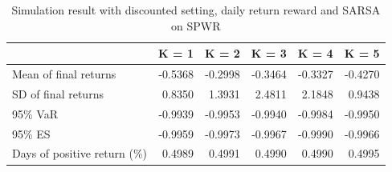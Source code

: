 \documentclass{article}
\begin{document}
\begin{table}[H]
\centering
\begin{tabular}{|l|r|r|r|r|r|} 
\hline
                             & \multicolumn{1}{l|}{K = 1} & \multicolumn{1}{l|}{K = 2} & \multicolumn{1}{l|}{K = 3} & \multicolumn{1}{l|}{K = 4} & \multicolumn{1}{l|}{K = 5}  \\ 
\hline
Mean of final returns        & -0.5368                    & -0.2998                    & -0.3464                    & -0.3327                    & -0.4270                     \\ 
\hline
SD of final returns          & 0.8350                     & 1.3931                     & 2.4811                     & 2.1848                     & 0.9438                      \\ 
\hline
95\% VaR                     & -0.9939                    & -0.9953                    & -0.9940                    & -0.9984                    & -0.9950                     \\ 
\hline
95\% ES                      & -0.9959                    & -0.9973                    & -0.9967                    & -0.9990                    & -0.9966                     \\ 
\hline
Days of positive return (\%) & 0.4989                     & 0.4991                     & 0.4990                     & 0.4990                     & 0.4995                      \\
\hline
\end{tabular}
\caption{Simulation result with discounted setting, daily return reward and SARSA on SPWR}
\label{table9}
\end{table}
\end{document}
